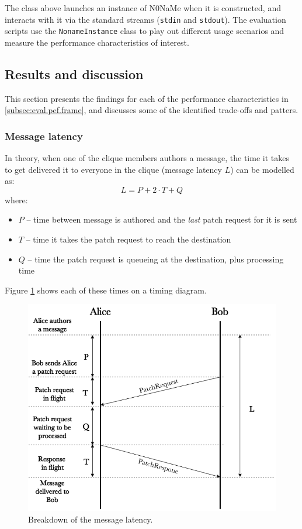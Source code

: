\documentclass[a4paper, twoside, 12pt]{report}
\newcommand{\funkytt}{\fontfamily{AnonymousPro}\selectfont}
\begin{document}
The class above launches an instance of {\funkytt N0NaMe} when it is constructed, and interacts with it via the standard streams (\texttt{stdin} and \texttt{stdout}). The evaluation scripts use the \texttt{NonameInstance} class to play out different usage scenarios and measure the performance characteristics of interest.


\subsection{Results and discussion}
\label{subsec:eval.perf.results}
This section presents the findings for each of the performance characteristics in \cref{subsec:eval.pef.frame}, and discusses some of the identified trade-offs and patters.

\subsubsection{Message latency}
In theory, when one of the clique members authors a message, the time it takes to get delivered it to everyone in the clique (message latency $L$) can be modelled as:
\begin{equation}
    L = P + 2 \cdot T + Q
    \label{eqn:latency}
\end{equation}
where:
\begin{itemize}
    \item $P$ -- time between message is authored and the \emph{last} patch request for it is sent
    \item $T$ -- time it takes the patch request to reach the destination
    \item $Q$ -- time the patch request is queueing at the destination, plus processing time
\end{itemize}
Figure \ref{fig:latency} shows each of these times on a timing diagram.

\begin{figure}[H]
    \captionsetup{width=1.0\textwidth}
    \centering
    \includegraphics[width=0.65\linewidth]{pics/eval/latency.png}
    \caption{\label{fig:latency} Breakdown of the message latency.}
\end{figure}
\end{document}
